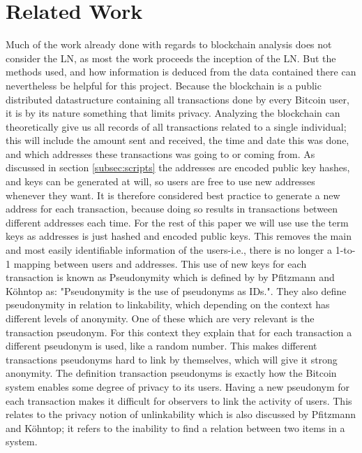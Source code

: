 
\section{Related Work}
\label{sec:related}

Much of the work already done with regards to blockchain analysis does not consider the LN, as most the work proceeds the inception of the LN. But the methods used, and how information is deduced from the data contained there can nevertheless be helpful for this project.
Because the blockchain is a public distributed datastructure containing all transactions done by every Bitcoin user, it is by its nature something that limits privacy. Analyzing the blockchain can theoretically give us all records of all transactions related to a single individual; this will include the amount sent and received, the time and date this was done, and which addresses these transactions was going to or coming from. As discussed in section \ref{subsec:scripts} the addresses are encoded public key hashes, and keys can be generated at will, so users are free to use new addresses whenever they want. It is therefore considered best practice to generate a new address for each transaction, because doing so results in transactions between different addresses each time. For the rest of this paper we will use use the term keys as addresses is just hashed and encoded public keys. 
This removes the main and most easily identifiable information of the users-i.e., there is no longer a 1-to-1 mapping between users and addresses.
This use of new keys for each transaction is known as Pseudonymity which is defined by by Pfitzmann and Köhntop \cite{pfitzmann2001anonymity} as: "Pseudonymity is the use of pseudonyms as IDs.". They also define pseudonymity in relation to linkability, which depending on the context has different levels of anonymity. One of these which are very relevant is the transaction pseudonym. For this context they explain that for each transaction a different pseudonym is used, like a random number. This makes different transactions pseudonyms hard to link by themselves, which will give it strong anonymity. The definition transaction pseudonyms is exactly how the Bitcoin system enables some degree of privacy to its users. Having a new pseudonym for each transaction makes it difficult for observers to link the activity of users. This relates to the privacy notion of unlinkability which is also discussed by Pfitzmann and Köhntop; it refers to the inability to find a relation between two items in a system. 
